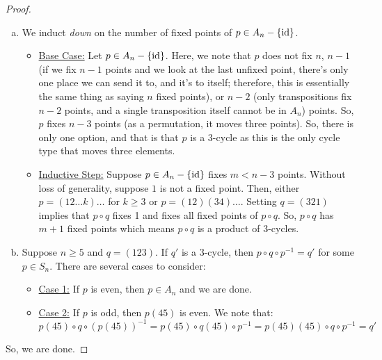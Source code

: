 \documentclass[letterpaper]{article}
\begin{document}
\begin{mdframed}
    \begin{proof}
        \begin{enumerate}[(a)]
            \item We induct \emph{down} on the number of fixed points of $p \in A_n - \{\operatorname{id}\}$. 
            \begin{itemize}
                \item \underline{Base Case:} Let $p \in A_n - \{\operatorname{id}\}$. Here, we note that $p$ does not fix $n$, $n - 1$ (if we fix $n - 1$ points and we look at the last unfixed point, there's only one place we can send it to, and it's to itself; therefore, this is essentially the same thing as saying $n$ fixed points), or $n - 2$ (only transpositions fix $n - 2$ points, and a single transposition itself cannot be in $A_n$) points. So, $p$ fixes $n - 3$ points (as a permutation, it moves three points). So, there is only one option, and that is that $p$ is a 3-cycle as this is the only cycle type that moves three elements. 
                \item \underline{Inductive Step:} Suppose $p \in A_n - \{\operatorname{id}\}$ fixes $m < n - 3$ points. Without loss of generality, suppose $1$ is not a fixed point. Then, either $p = (12 \dots k) \dots$ for $k \geq 3$ or $p = (12)(34) \dots$. Setting $q = (321)$ implies that $p \circ q$ fixes 1 and fixes all fixed points of $p \circ q$. So, $p \circ q$ has $m + 1$ fixed points which means $p \circ q$ is a product of 3-cycles. 
            \end{itemize}

            \item Suppose $n \geq 5$ and $q = (123)$. If $q'$ is a 3-cycle, then $p \circ q \circ p^{-1} = q'$ for some $p \in S_n$. There are several cases to consider: 
            \begin{itemize}
                \item \underline{Case 1:} If $p$ is even, then $p \in A_n$ and we are done. 
                \item \underline{Case 2:} If $p$ is odd, then $p(45)$ is even. We note that: 
                \[p(45) \circ q \circ (p(45))^{-1} = p(45) \circ q(45) \circ p^{-1} = p(45)(45) \circ q \circ p^{-1} = q'\]
            \end{itemize}
        \end{enumerate}
        So, we are done. 
    \end{proof}
\end{mdframed}
\end{document}
